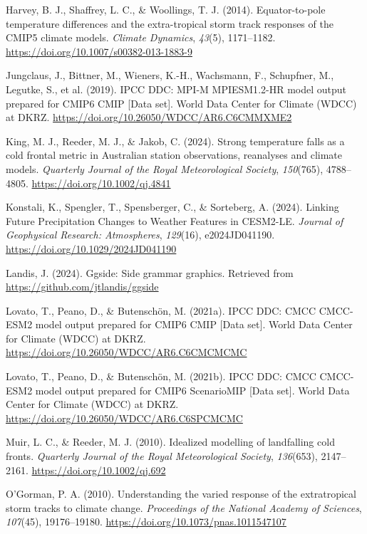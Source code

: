\documentclass[
]{agujournal2019}
\newlength{\cslhangindent}
\newenvironment{CSLReferences}[2] %
 {\begin{list}{}{%
  \setlength{\itemindent}{0pt}
  \setlength{\leftmargin}{0pt}
  \setlength{\parsep}{0pt}
  \ifodd #1
   \setlength{\leftmargin}{\cslhangindent}
   \setlength{\itemindent}{-1\cslhangindent}
  \fi
  \setlength{\itemsep}{#2\baselineskip}}}
 {\end{list}}
\begin{document}
\begin{CSLReferences}{1}{0}
Harvey, B. J., Shaffrey, L. C., \& Woollings, T. J. (2014).
Equator-to-pole temperature differences and the extra-tropical storm
track responses of the {CMIP5} climate models. \emph{Climate Dynamics},
\emph{43}(5), 1171--1182.
\url{https://doi.org/10.1007/s00382-013-1883-9}

Jungclaus, J., Bittner, M., Wieners, K.-H., Wachsmann, F., Schupfner,
M., Legutke, S., et al. (2019). {IPCC DDC}: {MPI-M MPIESM1}.2-{HR} model
output prepared for {CMIP6 CMIP} {[}Data set{]}. World Data Center for
Climate (WDCC) at DKRZ.
\url{https://doi.org/10.26050/WDCC/AR6.C6CMMXME2}

King, M. J., Reeder, M. J., \& Jakob, C. (2024). Strong temperature
falls as a cold frontal metric in {Australian} station observations,
reanalyses and climate models. \emph{Quarterly Journal of the Royal
Meteorological Society}, \emph{150}(765), 4788--4805.
\url{https://doi.org/10.1002/qj.4841}

Konstali, K., Spengler, T., Spensberger, C., \& Sorteberg, A. (2024).
Linking {Future Precipitation Changes} to {Weather Features} in
{CESM2-LE}. \emph{Journal of Geophysical Research: Atmospheres},
\emph{129}(16), e2024JD041190.
\url{https://doi.org/10.1029/2024JD041190}

Landis, J. (2024). Ggside: Side grammar graphics. Retrieved from
\url{https://github.com/jtlandis/ggside}

Lovato, T., Peano, D., \& Butenschön, M. (2021a). {IPCC DDC}: {CMCC
CMCC-ESM2} model output prepared for {CMIP6 CMIP} {[}Data set{]}. World
Data Center for Climate (WDCC) at DKRZ.
\url{https://doi.org/10.26050/WDCC/AR6.C6CMCMCMC}

Lovato, T., Peano, D., \& Butenschön, M. (2021b). {IPCC DDC}: {CMCC
CMCC-ESM2} model output prepared for {CMIP6 ScenarioMIP} {[}Data set{]}.
World Data Center for Climate (WDCC) at DKRZ.
\url{https://doi.org/10.26050/WDCC/AR6.C6SPCMCMC}

Muir, L. C., \& Reeder, M. J. (2010). Idealized modelling of landfalling
cold fronts. \emph{Quarterly Journal of the Royal Meteorological
Society}, \emph{136}(653), 2147--2161.
\url{https://doi.org/10.1002/qj.692}

O'Gorman, P. A. (2010). Understanding the varied response of the
extratropical storm tracks to climate change. \emph{Proceedings of the
National Academy of Sciences}, \emph{107}(45), 19176--19180.
\url{https://doi.org/10.1073/pnas.1011547107}


\end{CSLReferences}
\end{document}
